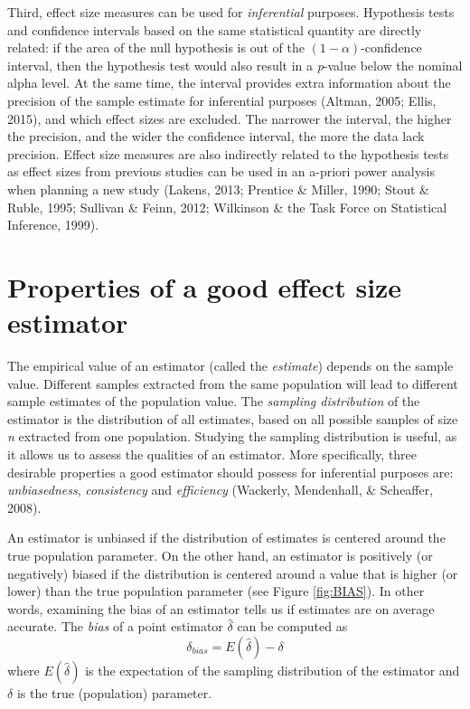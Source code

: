 \documentclass[
  english,
  man,floatsintext]{apa6}
\begin{document}
Third, effect size measures can be used for \emph{inferential} purposes. Hypothesis tests and confidence intervals based on the same statistical quantity are directly related: if the area of the null hypothesis is out of the \((1-\alpha)\)-confidence interval, then the hypothesis test would also result in a \emph{p}-value below the nominal alpha level. At the same time, the interval provides extra information about the precision of the sample estimate for inferential purposes (Altman, 2005; Ellis, 2015), and which effect sizes are excluded. The narrower the interval, the higher the precision, and the wider the confidence interval, the more the data lack precision. Effect size measures are also indirectly related to the hypothesis tests as effect sizes from previous studies can be used in an a-priori power analysis when planning a new study (Lakens, 2013; Prentice \& Miller, 1990; Stout \& Ruble, 1995; Sullivan \& Feinn, 2012; Wilkinson \& the Task Force on Statistical Inference, 1999).

\hypertarget{properties-of-a-good-effect-size-estimator}{%
\section{Properties of a good effect size estimator}\label{properties-of-a-good-effect-size-estimator}}

The empirical value of an estimator (called the \emph{estimate}) depends on the sample value. Different samples extracted from the same population will lead to different sample estimates of the population value. The \emph{sampling distribution} of the estimator is the distribution of all estimates, based on all possible samples of size \emph{n} extracted from one population. Studying the sampling distribution is useful, as it allows us to assess the qualities of an estimator. More specifically, three desirable properties a good estimator should possess for inferential purposes are: \emph{unbiasedness}, \emph{consistency} and \emph{efficiency} (Wackerly, Mendenhall, \& Scheaffer, 2008).

An estimator is unbiased if the distribution of estimates is centered around the true population parameter. On the other hand, an estimator is positively (or negatively) biased if the distribution is centered around a value that is higher (or lower) than the true population parameter (see Figure \ref{fig:BIAS}). In other words, examining the bias of an estimator tells us if estimates are on average accurate. The \emph{bias} of a point estimator \(\hat{\delta}\) can be computed as
\begin{equation} 
\delta_{bias}=E(\hat{\delta})-\delta
\label{eq:BIAS}
\end{equation}
where \(E(\hat{\delta})\) is the expectation of the sampling distribution of the estimator and \(\delta\) is the true (population) parameter.
\end{document}
